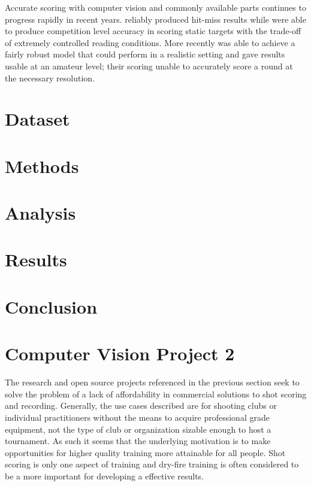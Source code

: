 \documentclass[conference]{IEEEtran}
\begin{document}
Accurate scoring with computer vision and commonly available parts continues to progress rapidly in recent years.
\cite{Ye2011} reliably produced  hit-miss results while \cite{Rudzinski2012} were able to produce competition level accuracy in scoring static targets with the trade-off of extremely controlled reading conditions.
More recently \cite{Stenhager2021} was able to achieve a fairly robust model that could perform in a realistic setting and gave results usable at an amateur level; their scoring unable to accurately score a round at the necessary resolution.





\section{Dataset}


\section{Methods}
\section{Analysis}
\section{Results}
\section{Conclusion}







\section{Computer Vision Project 2}

The research and open source projects referenced in the previous section seek to solve the problem of a lack of affordability in commercial solutions to shot scoring and recording.
Generally, the use cases described are for shooting clubs or individual practitioners without the means to acquire professional grade equipment, not the type of club or organization sizable enough to host a tournament.
As such it seems that the underlying motivation is to make opportunities for higher quality training more attainable for all people.
Shot scoring is only one aspect of training and dry-fire training is often \cite{Potter2017}
considered to be a more important for developing a effective results.
\end{document}

